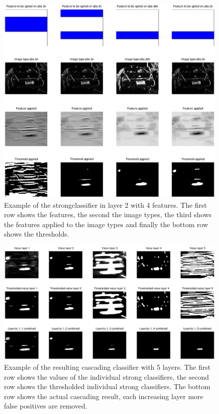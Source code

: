 \documentclass[a4paper,11pt]{article}
\begin{document}
\begin{figure}[!ht]
\centering
\includegraphics[width=16cm]{img/strongClassifier_layer2_img14}
\caption{Example of the strongclassifier in layer 2 with 4 features. The first
row shows the features, the second the image types, the third shows the
features applied to the image types and finally the bottom row shows the
thresholds.}
\label{fig:strongclassify}
\end{figure}

\begin{figure}[!ht]
\centering
\includegraphics[width=16cm]{img/cascader_img14}
\caption{Example of the resulting cascading classifier with 5 layers. The first
row shows the values of the individual strong classifiers, the second row shows
the thresholded individual strong classifiers. The bottom row shows the actual
cascading result, each increasing layer more false positives are removed.}
\label{fig:cascader}
\end{figure}
\end{document}
